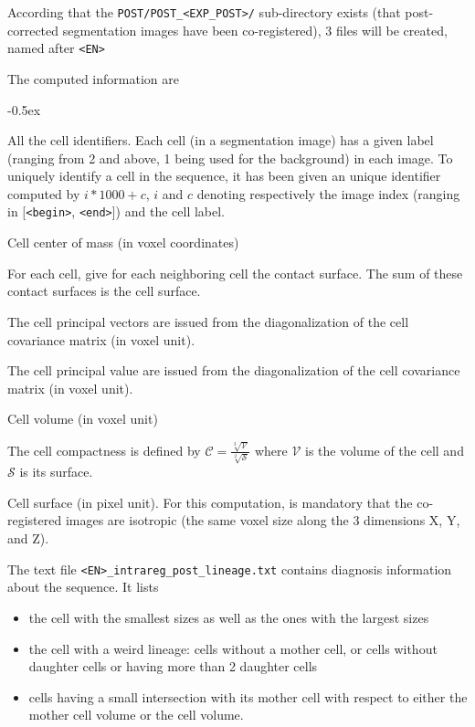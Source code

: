According that the \texttt{POST/POST\_<EXP\_POST>/} sub-directory exists (that post-corrected segmentation images have been co-registered), 3 files will be created, named after \texttt{<EN>}

\mbox{}

The computed information are
\begin{description}
  \itemsep -0.5ex
\item[\texttt{all\_cells}] All the cell identifiers. Each cell (in a segmentation image) has a given label (ranging from 2 and above, 1 being used for the background) in each image. To uniquely identify a cell in the sequence, it has been given an unique identifier computed by $i * 1000 + c$, $i$ and $c$ denoting respectively the image index (ranging in [\texttt{<begin>}, \texttt{<end>}]) and the cell label.
\item[\texttt{cell\_barycenter}] Cell center of mass (in voxel coordinates)
\item[\texttt{cell\_contact\_surface}] For each cell, give for each neighboring cell the contact surface. The sum of these contact surfaces is the cell surface.
\item[\texttt{cell\_principal\_vectors}] The cell principal vectors are issued from the diagonalization of the cell covariance matrix (in voxel unit).
\item[\texttt{cell\_principal\_values}] The cell principal value are issued from the diagonalization of the cell covariance matrix (in voxel unit).
\item[\texttt{cell\_volume}] Cell volume (in voxel unit)
\item[\texttt{cell\_compactness}] The cell compactness is defined by $\mathcal{C} =\frac{\sqrt[3]{\mathcal{V}}}{\sqrt[2]{\mathcal{S}}}$ where $\mathcal{V}$ is the volume of the cell and $\mathcal{S}$ is its surface.
\item[\texttt{cell\_surface}] Cell surface (in pixel unit). For this computation, is mandatory that the co-registered images are isotropic (the same voxel size along the 3 dimensions X, Y, and Z).
\item[\texttt{cell\_lineage}]
\end{description}

The text file \texttt{<EN>\_intrareg\_post\_lineage.txt} contains diagnosis information about the sequence. It lists
\begin{itemize}
  \itemsep -0.5ex
\item the cell with the smallest sizes as well as the ones with the largest sizes
\item the cell with a weird lineage: cells without a mother cell, or cells without daughter cells or having more than 2 daughter cells
\item cells having a small intersection with its mother cell with respect to either the mother cell volume or the cell volume. 
\end{itemize}


